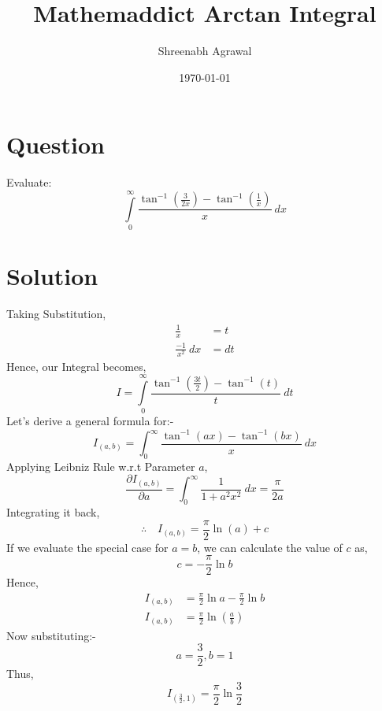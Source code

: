 \documentclass{article}
\title{Mathemaddict Arctan Integral}
\author{Shreenabh Agrawal}
\date{\today}
\begin{document}
\maketitle

\section{Question}
Evaluate: $$\int\limits_{0}^{\infty} \frac{\tan ^{-1}\left(\frac{3}{2 x}\right)-\tan ^{-1}\left(\frac{1}{x}\right)}{x} \: d x$$
\section{Solution}

Taking Substitution,
$$\begin{aligned}
\frac{1}{x} &=t \\
\frac{-1}{x^{2}} \: d x &=d t
\end{aligned}$$
Hence, our Integral becomes,
$$I=\int\limits_{0}^{\infty} \frac{\tan ^{-1}\left(\frac{3 t}{2}\right)-\tan ^{-1}(t)}{t} \: dt$$
Let's derive a general formula for:-
$$I_{(a, b)}=\int_{0}^{\infty} \frac{\tan ^{-1}(a x)-\tan ^{-1}(b x)}{x} \: dx$$
Applying Leibniz Rule w.r.t Parameter $a$, 
$$\frac{\partial I_{(a, b)}}{\partial a}=\int_{0}^{\infty} \frac{1}{1+a^{2} x^{2}}\:  d x=\frac{\pi}{2 a}$$
Integrating it back, 
$$\therefore \quad I_{(a, b)}=\frac{\pi}{2} \ln (a)+c$$
If we evaluate the special case for $a=b$,
we can calculate the value of $c$ as,
$$c=-\frac{\pi}{2} \ln b$$
Hence,
$$\begin{aligned}
I_{(a, b)} 
&=\frac{\pi}{2} \ln a-\frac{\pi}{2} \ln b \\
I_{(a, b)}
&=\frac{\pi}{2} \ln \left(\frac{a}{b}\right)
\end{aligned}$$
Now substituting:-
$$a=\frac{3}{2}, b=1$$
Thus,
$$\boxed{I_{\left(\frac{3}{2}, 1\right)}=\frac{\pi}{2} \ln \frac{3}{2}}$$
\end{document}
